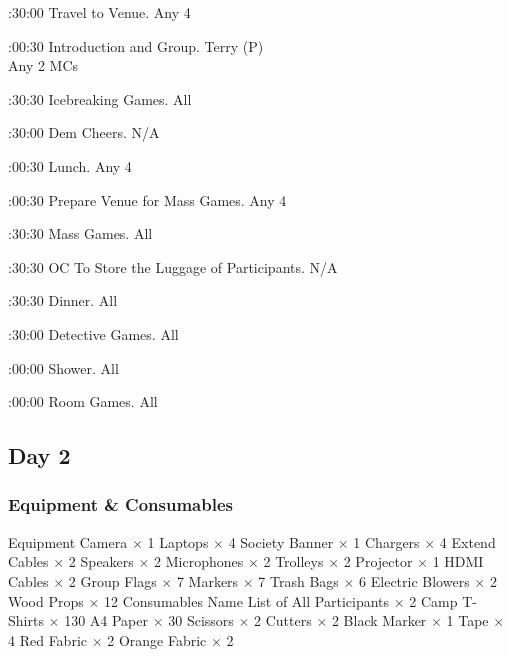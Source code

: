 \bTR{}:30:00
\eTD\bTD Travel to Venue.
\eTD\bTD Any 4
\eTD\eTR

\bTR{}:00:30
\eTD\bTD Introduction and Group.
\eTD\bTD Terry (P) \\ Any 2 MCs
\eTD\eTR

\bTR{}:30:30
\eTD\bTD Icebreaking Games.
\eTD\bTD All
\eTD\eTR

\bTR{}:30:00
\eTD\bTD Dem Cheers.
\eTD\bTD N/A
\eTD\eTR

\bTR{}:00:30
\eTD\bTD Lunch.
\eTD\bTD Any 4
\eTD\eTR

\bTR{}:00:30
\eTD\bTD Prepare Venue for Mass Games.
\eTD\bTD Any 4
\eTD\eTR

\bTR{}:30:30
\eTD\bTD Mass Games.
\eTD\bTD All
\eTD\eTR

\bTR{}:30:30
\eTD\bTD OC To Store the Luggage of Participants.
\eTD\bTD N/A
\eTD\eTR

\bTR{}:30:30
\eTD\bTD Dinner.
\eTD\bTD All
\eTD\eTR

\bTR{}:30:00
\eTD\bTD Detective Games.
\eTD\bTD All
\eTD\eTR

\bTR{}:00:00
\eTD\bTD Shower.
\eTD\bTD All
\eTD\eTR

\bTR{}:00:00
\eTD\bTD Room Games.
\eTD\bTD All
\eTD\eTR

\eTABLEbody
\eTABLE

\subsection{Day 2}

\subsubsection{Equipment \& Consumables}
\starttabulate[|l|l|]
\NC{}Equipment\NC\NR
\HL
\NC Camera \NC $\times$ 1 \NR
\NC Laptops \NC $\times$ 4 \NR
\NC Society Banner \NC $\times$ 1 \NR
\NC Chargers \NC $\times$ 4 \NR
\NC Extend Cables \NC $\times$ 2 \NR
\NC Speakers \NC $\times$ 2 \NR
\NC Microphones \NC $\times$ 2 \NR
\NC Trolleys \NC $\times$ 2 \NR
\NC Projector \NC $\times$ 1 \NR
\NC HDMI Cables \NC $\times$ 2 \NR
\NC Group Flags \NC $\times$ 7 \NR
\NC Markers \NC $\times$ 7 \NR
\NC Trash Bags \NC $\times$ 6 \NR
\NC Electric Blowers \NC $\times$ 2 \NR
\NC Wood Props \NC $\times$ 12 \NR
\HL
\NR
\NC{}Consumables\NC\NR
\HL
\NC Name List of All Participants \NC $\times$ 2 \NR
\NC Camp T-Shirts \NC $\times$ 130 \NR
\NC A4 Paper \NC $\times$ 30 \NR
\NC Scissors \NC $\times$ 2 \NR
\NC Cutters \NC $\times$ 2 \NR
\NC Black Marker \NC $\times$ 1 \NR
\NC Tape \NC $\times$ 4 \NR
\NC Red Fabric \NC $\times$ 2 \NR
\NC Orange Fabric \NC $\times$ 2 \NR
\HL
\stoptabulate

